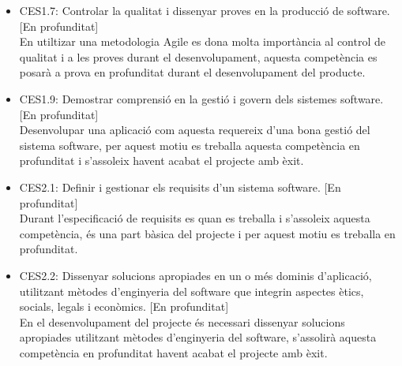 \begin{itemize}
\item{}CES1.7: Controlar la qualitat i dissenyar proves en la producció de software. [En profunditat]\\
En utiltizar una metodologia Agile es dona molta importància al control de
qualitat i a les proves durant el desenvolupament, aquesta competència es posarà a prova en profunditat durant el desenvolupament del producte.
\item{}CES1.9: Demostrar comprensió en la gestió i govern dels sistemes software. [En profunditat]\\
Desenvolupar una aplicació com aquesta requereix d’una bona gestió del sistema software, per aquest motiu es treballa aquesta competència en profunditat i s’assoleix havent acabat el projecte amb èxit.
\item{}CES2.1: Definir i gestionar els requisits d’un sistema software. [En profunditat]\\
Durant l’especificació de requisits es quan es treballa i s’assoleix aquesta competència, és una part bàsica del projecte i per aquest motiu es treballa en profunditat.
\item{}CES2.2: Dissenyar solucions apropiades en un o més dominis d’aplicació, utilitzant mètodes d’enginyeria del software que integrin aspectes ètics, socials, legals i econòmics. [En profunditat]\\
En el desenvolupament del projecte és necessari dissenyar solucions apropiades utilitzant mètodes d’enginyeria del software, s’assolirà aquesta competència en profunditat havent acabat el projecte amb èxit.
\end{itemize}

